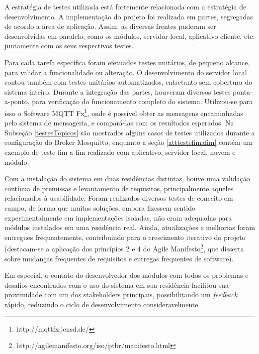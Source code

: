 A estratégia de testes utilizada está fortemente relacionada com a estratégia de desenvolvimento. A implementação do projeto foi realizada em partes, segregadas de acordo a área de aplicação. Assim, as diversas frentes puderam ser desenvolvidas em paralelo, como os módulos, servidor local, aplicativo cliente, etc. juntamente com os seus respectivos testes.

Para cada tarefa específica foram efetuados testes unitários, de pequeno alcance, para validar a funcionalidade ou alteração. O desenvolvimento do servidor local contou também com testes unitários automatizados, entretanto sem cobertura do sistema inteiro. Durante a integração das partes, houveram diversos testes ponta-a-ponto, para verificação do funcionamento completo do sistema. Utilizou-se para isso o Software MQTT Fx\footnote{http://mqttfx.jensd.de/}, onde é possível obter as mensagens encaminhadas pelo sistema de mensageria, e compará-las com os resultados esperados. Na Subseção \ref{testesTopicos} são mostrados alguns casos de testes utilizados durante a configuração do Broker Mosquitto, enquanto a seção \ref{atttestefimafim} contém um exemplo de teste fim a fim realizado com aplicativo, servidor local, nuvem e módulo.

Com a instalação do sistema em duas residências distintas, houve uma validação contínua de premissas e levantamento de requisitos, principalmente aqueles relacionados à usabilidade. Foram realizados diversos testes de conceito em campo, de forma que muitas soluções, embora fizessem sentido experimentalmente em implementações isoladas, não eram adequadas para módulos instalados em uma residência real. Ainda, atualizações e melhorias foram entregues frequentemente, contribuindo para o crescimento iterativo do projeto (destacam-se a aplicação dos princípios 2 e 4 do Agile Manifesto\footnote{http://agilemanifesto.org/iso/ptbr/manifesto.html}, que disserta sobre mudanças frequentes de requisitos e entregas frequentes de software).

Em especial, o contato do desenvolvedor dos módulos com todos os problemas e desafios encontrados com o uso do sistema em sua residência facilitou sua proximidade com um dos stakeholders principais, possibilitando um \textit{feedback} rápido, reduzindo o ciclo de desenvolvimento consideravelmente.